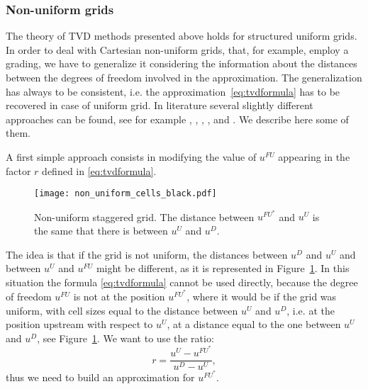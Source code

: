 \subsubsection{Non-uniform grids}
The theory of TVD methods presented above holds for structured uniform grids. In order 
to deal with Cartesian non-uniform grids, that, for example, employ a grading, we 
have to generalize it considering the information about the distances between 
the degrees of freedom involved in the approximation. The generalization has 
always to be consistent, i.e. the approximation~\eqref{eq:tvdformula} has to be 
recovered in case of uniform grid. In literature several slightly different 
approaches can be found, see for example \cite{nonunif:bruner}, 
\cite{nonunif:darmou}, \cite{nonunif:li}, \cite{nonunif:berger}, 
\cite{nonunif:hou} and \cite{nonunif:zeng}. We describe here some of them.

A first simple approach consists in modifying the value of $u^{FU}$ appearing 
in the factor $r$ defined in \eqref{eq:tvdformula}.
\begin{figure}
	\centering
	\texttt{[image: non\_uniform\_cells\_black.pdf]}
	\caption[Non-uniform staggered grid]{Non-uniform staggered grid. The 
	distance between $u^{FU^*}$ and $u^U$ is the same that there is between 
	$u^U$ and $u^D$.}
	\label{fig:nonunifli}
\end{figure}

The idea is that if the grid is not uniform, the distances between $u^D$ and 
$u^U$ and between $u^U$ and $u^{FU}$ might be different, as it is represented 
in Figure~\ref{fig:nonunifli}. In this situation the formula 
\eqref{eq:tvdformula} cannot be used directly, because the degree of freedom 
$u^{FU}$ is not at the position 
$u^{FU^*}$, where it would be if the grid was uniform, with cell sizes equal to 
the distance between $u^U$ and $u^D$, i.e. at the position upstream with 
respect to $u^U$, at a distance equal to the one between $u^U$ and $u^D$, see 
Figure~\ref{fig:nonunifli}. We want to use the ratio:
\begin{equation*}
r = \frac{u^U - u^{FU^*}}{u^D - u^U},
\end{equation*}
thus we need to build an approximation for $u^{FU^*}$.

